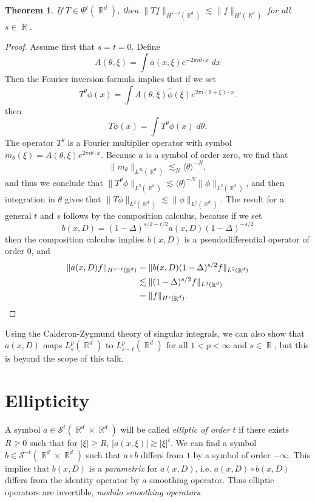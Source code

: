 \documentclass{article}
\DeclareMathOperator{\RR}{\mathbb{R}}
\theoremstyle{plain}
\newtheorem{theorem}{Theorem}
\theoremstyle{definition}
\begin{document}
\begin{theorem}
    If $T \in \Psi^t(\RR^d)$, then $\| Tf \|_{H^{s-t}(\RR^d)} \lesssim \| f \|_{H^s(\RR^d)}$ for all $s \in \RR$.
\end{theorem}
\begin{proof}
    Assume first that $s = t = 0$. Define
    \[ A(\theta,\xi) = \int a(x,\xi) e^{-2 \pi i \theta \cdot x}\; dx \]
    Then the Fourier inversion formula implies that if we set
    \[ T^\theta \phi(x) = \int A(\theta,\xi) \widehat{\phi}(\xi) e^{2 \pi i (\theta + \xi) \cdot x}. \]
    then
    \[ T \phi(x) = \int T^\theta \phi(x)\; d\theta. \]
    The operator $T^\theta$ is a Fourier multiplier operator with symbol $m_\theta(\xi) = A(\theta,\xi) e^{2 \pi i \theta \cdot x}$. Because $a$ is a symbol of order zero, we find that
    \[ \| m_\theta \|_{L^\infty(\RR^d)} \lesssim_N \langle \theta \rangle^{-N}, \]
    and thus we conclude that $\| T^\theta \phi \|_{L^2(\RR^d)} \lesssim \langle \theta \rangle^{-N} \| \phi \|_{L^2(\RR^d)}$, and then integration in $\theta$ gives that $\| T \phi \|_{L^2(\RR^d)} \lesssim \| \phi \|_{L^2(\RR^d)}$. The result for a general $t$ and $s$ follows by the composition calculus, because if we set
    \[ b(x,D) = (1 - \Delta)^{s/2 - t/2} a(x,D) (1 - \Delta)^{-s/2} \]
    then the composition calculus implies $b(x,D)$ is a pseudodifferential operator of order 0, and
    \begin{align*}
        \| a(x,D) f \|_{H^{s-t}(\RR^d)} &= \| b(x,D) (1 - \Delta)^{s/2} f \|_{L^2(\RR^d)}\\
        &\lesssim \| (1 - \Delta)^{s/2} f \|_{L^2(\RR^d)}\\
        &= \| f \|_{H^s(\RR^d)}. \qedhere
    \end{align*}
\end{proof}

Using the Calderon-Zygmund theory of singular integrals, we can also show that $a(x,D)$ maps $L^p_s(\RR^d)$ to $L^p_{s-t}(\RR^d)$ for all $1 < p < \infty$ and $s \in \RR$, but this is beyond the scope of this talk.

\section{Ellipticity}

A symbol $a \in \mathcal{S}^t(\RR^d \times \RR^d)$ will be called \emph{elliptic of order $t$} if there exists $R \geq 0$ such that for $|\xi| \geq R$, $|a(x,\xi)| \gtrsim |\xi|^t$. We can find a symbol $b \in \mathcal{S}^{-t}(\RR^d \times \RR^d)$ such that $a \circ b$ differs from $1$ by a symbol of order $-\infty$. This implies that $b(x,D)$ is a \emph{parametrix} for $a(x,D)$, i.e. $a(x,D) \circ b(x,D)$ differs from the identity operator by a smoothing operator. Thus elliptic operators are invertible, \emph{modulo smoothing operators}.
\end{document}
